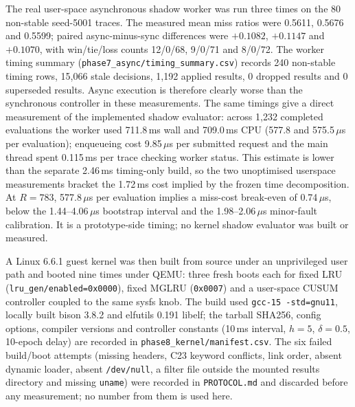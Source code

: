 \documentclass[journal,onecolumn]{IEEEtran}
\begin{document}
The real user-space asynchronous shadow worker was run three times on the 80
non-stable seed-5001 traces. The measured mean miss ratios were 0.5611, 0.5676
and 0.5599; paired async-minus-sync differences were $+0.1082$, $+0.1147$ and
$+0.1070$, with win/tie/loss counts 12/0/68, 9/0/71 and 8/0/72. The worker
timing summary (\texttt{phase7\_async/timing\_summary.csv}) records 240
non-stable timing rows, 15,066 stale decisions, 1,192 applied results, 0
dropped results and 0 superseded results. Async execution is therefore clearly
worse than the synchronous controller in these measurements. The same timings
give a direct measurement of the implemented shadow evaluator: across 1{,}232
completed evaluations the worker used 711.8\,ms wall and 709.0\,ms CPU
(577.8 and 575.5\,$\mu$s per evaluation); enqueueing cost 9.85\,$\mu$s per
submitted request and the main thread spent 0.115\,ms per trace checking
worker status. This estimate is lower than the separate 2.46\,ms timing-only
build, so the two unoptimised userspace measurements bracket the 1.72\,ms cost
implied by the frozen time decomposition. At $R=783$, 577.8\,$\mu$s per
evaluation implies a miss-cost break-even of 0.74\,$\mu$s, below the
1.44--4.06\,$\mu$s bootstrap interval and the 1.98--2.06\,$\mu$s minor-fault
calibration. It is a prototype-side timing; no kernel shadow evaluator was
built or measured.

A Linux 6.6.1 guest kernel was then built from source under an unprivileged
user path and booted nine times under QEMU: three fresh boots each for fixed
LRU (\texttt{lru\_gen/enabled=0x0000}), fixed MGLRU (\texttt{0x0007}) and a
user-space CUSUM controller coupled to the same sysfs knob. The build used
\texttt{gcc-15 -std=gnu11}, locally built bison 3.8.2 and elfutils 0.191
libelf; the tarball SHA256, config options, compiler versions and controller
constants (10\,ms interval, $h=5$, $\delta=0.5$, 10-epoch delay) are recorded in
\texttt{phase8\_kernel/manifest.csv}. The six failed build/boot attempts
(missing headers, C23 keyword conflicts, link order, absent dynamic loader,
absent \texttt{/dev/null}, a filter file outside the mounted results directory
and missing \texttt{uname}) were recorded in \texttt{PROTOCOL.md} and discarded
before any measurement; no number from them is used here.
\end{document}
